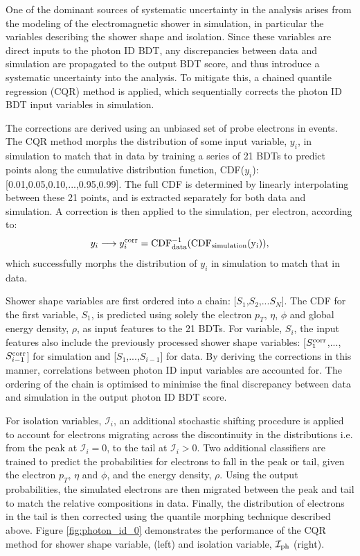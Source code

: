 One of the dominant sources of systematic uncertainty in the \Hgg analysis arises from the modeling of the electromagnetic shower in simulation, in particular the variables describing the shower shape and isolation. Since these variables are direct inputs to the photon ID BDT, any discrepancies between data and simulation are propagated to the output BDT score, and thus introduce a systematic uncertainty into the analysis. To mitigate this, a chained quantile regression (CQR) method is applied, which sequentially corrects the photon ID BDT input variables in simulation. 

The corrections are derived using an unbiased set of probe electrons in \Zee events. The CQR method morphs the distribution of some input variable, $y_i$, in simulation to match that in data by training a series of 21 BDTs to predict points along the cumulative distribution function, CDF($y_i$): [0.01,0.05,0.10,...,0.95,0.99]. The full CDF is determined by linearly interpolating between these 21 points, and is extracted separately for both data and simulation. A correction is then applied to the simulation, per electron, according to:
\begin{equation}
    y_i \longrightarrow y_i^{\rm{corr}} = \rm{CDF}^{-1}_{\rm{data}}(\rm{CDF}_{\rm{simulation}}(y_i)),
\end{equation}
\noindent 
which successfully morphs the distribution of $y_i$ in simulation to match that in data. 

Shower shape variables are first ordered into a chain: [$S_1$,$S_2$,...$S_N$]. The CDF for the first variable, $S_1$, is predicted using solely the electron $p_T$, $\eta$, $\phi$ and global energy density, $\rho$, as input features to the 21 BDTs. For variable, $S_i$, the input features also include the previously processed shower shape variables: [$S^{\rm{corr}}_1$,...,$S^{\rm{corr}}_{i-1}$] for simulation and [$S_1$,...,$S_{i-1}$] for data. By deriving the corrections in this manner, correlations between photon ID input variables are accounted for. The ordering of the chain is optimised to minimise the final discrepancy between data and simulation in the output photon ID BDT score.

For isolation variables, $\mathcal{I}_i$, an additional stochastic shifting procedure is applied to account for electrons migrating across the discontinuity in the distributions i.e. from the peak at $\mathcal{I}_i=0$, to the tail at $\mathcal{I}_i>0$. Two additional classifiers are trained to predict the probabilities for electrons to fall in the peak or tail, given the electron $p_T$, $\eta$ and $\phi$, and the energy density, $\rho$. Using the output probabilities, the simulated electrons are then migrated between the peak and tail to match the relative compositions in data. Finally, the distribution of electrons in the tail is then corrected using the quantile morphing technique described above. Figure \ref{fig:photon_id_0} demonstrates the performance of the CQR method for shower shape variable, \RNINE (left) and isolation variable, $\mathcal{I}_{\rm{ph}}$ (right).

